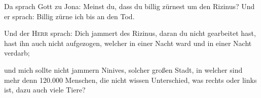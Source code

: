  Da sprach Gott zu Jona: Meinst du, dass du billig zürnest
um den Rizinus? Und er sprach: Billig zürne ich bis an den Tod.

 Und der \textsc{Herr} sprach: Dich jammert des Rizinus,
daran du nicht gearbeitet hast, hast ihn auch nicht aufgezogen, welcher
in einer Nacht ward und in einer Nacht verdarb;

 und mich sollte nicht jammern Ninives, solcher großen
Stadt, in welcher sind mehr denn 120.000 Menschen, die nicht wissen
Unterschied, was rechts oder links ist, dazu auch viele Tiere?
